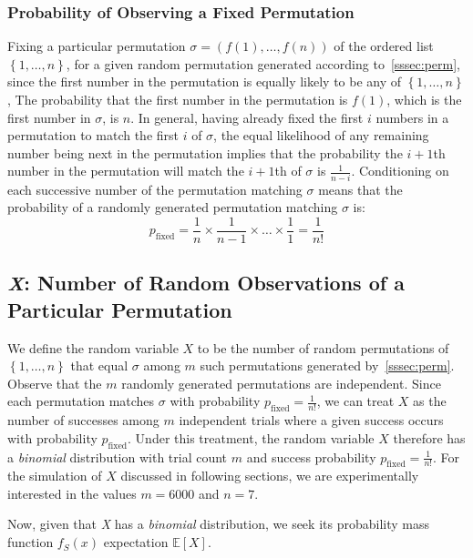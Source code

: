 \documentclass[11pt, oneside]{article}   	%
\begin{document}
\subsubsection{Probability of Observing a Fixed Permutation}
Fixing a particular permutation $\sigma = (f(1), \dots, f(n))$ of the ordered list $\left\{1, \dots, n\right\}$, for a given random permutation generated according to~\ref{sssec:perm}, since the first number in the permutation is equally likely to be any of $\left\{1, \dots, n\right\}$, The probability that the first number in the permutation is $f(1)$, which is the first number in $\sigma$, is $n$. In general, having already fixed the first $i$ numbers in a permutation to match the first $i$ of $\sigma$, the equal likelihood of any remaining number being next in the permutation implies that the probability the $i + 1$th number in the permutation will match the $i + 1$th of $\sigma$ is $\frac{1}{n - i}$. Conditioning on each successive number of the permutation matching $\sigma$ means that the probability of a randomly generated permutation matching $\sigma$ is:
\begin{equation}\label{eqn:fix}
  p_{\text{fixed}} = \frac{1}{n} \times \frac{1}{n - 1} \times \dots \times \frac{1}{1} = \frac{1}{n!}
\end{equation}

\subsection{\textit{X}: Number of Random Observations of a Particular Permutation}\label{ssec:x}
We define the random variable $X$ to be the number of random permutations of $\left\{1, \dots, n\right\}$ that equal $\sigma$ among $m$ such permutations generated by~\ref{sssec:perm}. Observe that the $m$ randomly generated permutations are independent. Since each permutation matches $\sigma$ with probability $p_{\text{fixed}} = \frac{1}{n!}$, we can treat $X$ as the number of successes among $m$ independent trials where a given success occurs with probability $p_{\text{fixed}}$. Under this treatment, the random variable $X$ therefore has a \textit{binomial} distribution with trial count $m$ and success probability $p_{\text{fixed}} = \frac{1}{n!}$. For the simulation of $X$ discussed in following sections, we are experimentally interested in the values $m = 6000$ and $n = 7$.

Now, given that \textit{X} has a \textit{binomial} distribution, we seek its probability mass function $f_S(x)$ expectation $\mathbb{E}[X]$.
\end{document}
